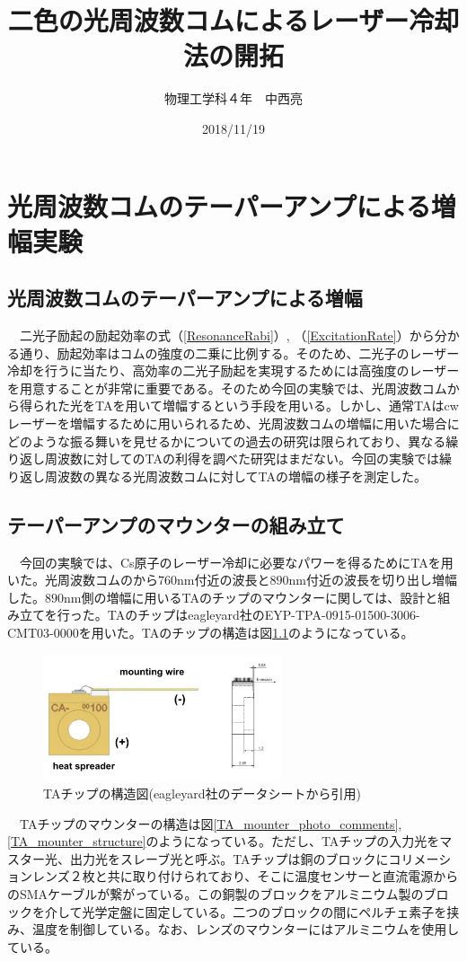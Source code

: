 \documentclass[uplatex, dvipdfmx, a4paper, report, papersize, 11pt]{jsbook}
\title{二色の光周波数コムによるレーザー冷却法の開拓}
\author{物理工学科４年　中西亮}
\date{2018/11/19}
\begin{document}
\maketitle
\newpage

\setcounter{tocdepth}{2}
\tableofcontents


\newpage
\chapter{光周波数コムのテーパーアンプによる増幅実験}
\section{光周波数コムのテーパーアンプによる増幅}
　二光子励起の励起効率の式（\ref{ResonanceRabi}）, （\ref{ExcitationRate}）から分かる通り、励起効率はコムの強度の二乗に比例する。そのため、二光子のレーザー冷却を行うに当たり、高効率の二光子励起を実現するためには高強度のレーザーを用意することが非常に重要である。そのため今回の実験では、光周波数コムから得られた光をTAを用いて増幅するという手段を用いる。しかし、通常TAはcwレーザーを増幅するために用いられるため、光周波数コムの増幅に用いた場合にどのような振る舞いを見せるかについての過去の研究は限られており、異なる繰り返し周波数に対してのTAの利得を調べた研究はまだない。今回の実験では繰り返し周波数の異なる光周波数コムに対してTAの増幅の様子を測定した。

\newpage
\section{テーパーアンプのマウンターの組み立て}
　今回の実験では、Cs原子のレーザー冷却に必要なパワーを得るためにTAを用いた。光周波数コムのから$760 \mathrm{nm}$付近の波長と$890 \mathrm{nm}$付近の波長を切り出し増幅した。$890 \mathrm{nm}$側の増幅に用いるTAのチップのマウンターに関しては、設計と組み立てを行った。TAのチップはeagleyard社のEYP-TPA-0915-01500-3006-CMT03-0000を用いた。TAのチップの構造は図\ref{TA_chip_ds}のようになっている。\\
\begin{figure}[htbp]
 \begin{center}
  \includegraphics[width=70mm]{figures/chapter4/TA_chip_ds.png}
\end{center}
 \caption{TAチップの構造図(eagleyard社のデータシートから引用)}
 \label{TA_chip_ds}
\end{figure}
　TAチップのマウンターの構造は図\ref{TA_mounter_photo_comments},\ref{TA_mounter_structure}のようになっている。ただし、TAチップの入力光をマスター光、出力光をスレーブ光と呼ぶ。TAチップは銅のブロックにコリメーションレンズ２枚と共に取り付けられており、そこに温度センサーと直流電源からのSMAケーブルが繋がっている。この銅製のブロックをアルミニウム製のブロックを介して光学定盤に固定している。二つのブロックの間にペルチェ素子を挟み、温度を制御している。なお、レンズのマウンターにはアルミニウムを使用している。
\end{document}
